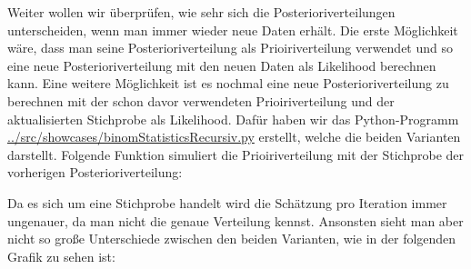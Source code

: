 \documentclass[a4paper,12pt]{article}
\begin{document}
Weiter wollen wir überprüfen, wie sehr sich die Posterioriverteilungen unterscheiden, wenn man immer wieder neue Daten erhält. Die erste Möglichkeit wäre, dass man seine Posterioriverteilung als Prioiriverteilung verwendet und so eine neue Posterioriverteilung mit den neuen Daten als Likelihood berechnen kann. Eine weitere Möglichkeit ist es nochmal eine neue Posterioriverteilung zu berechnen mit der schon davor verwendeten Prioiriverteilung und der aktualisierten Stichprobe als Likelihood. Dafür haben wir das Python-Programm \url{../src/showcases/binomStatisticsRecursiv.py} erstellt, welche die beiden Varianten darstellt. Folgende Funktion simuliert die Prioiriverteilung mit der Stichprobe der vorherigen Posterioriverteilung:

\noindent Da es sich um eine Stichprobe handelt wird die Schätzung pro Iteration immer ungenauer, da man nicht die genaue Verteilung kennst. Ansonsten sieht man aber nicht so große Unterschiede zwischen den beiden Varianten, wie in der folgenden Grafik zu sehen ist:
\end{document}
